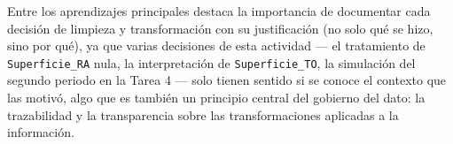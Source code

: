 \documentclass[11pt]{article}
\begin{document}
Entre los aprendizajes principales destaca la importancia de documentar cada decisión de
limpieza y transformación con su justificación (no solo qué se hizo, sino por qué), ya que
varias decisiones de esta actividad --- el tratamiento de \texttt{Superficie\_RA} nula, la
interpretación de \texttt{Superficie\_TO}, la simulación del segundo periodo en la Tarea 4
--- solo tienen sentido si se conoce el contexto que las motivó, algo que es también un
principio central del gobierno del dato: la trazabilidad y la transparencia sobre las
transformaciones aplicadas a la información.
\end{document}
